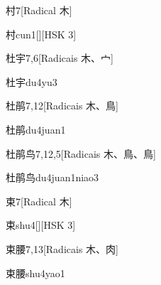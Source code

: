 \begin{entry}{村}{7}[Radical ⽊]
  \begin{phonetics}{村}{cun1}[][HSK 3]
  \end{phonetics}
\end{entry}

\begin{entry}{杜宇}{7,6}[Radicais ⽊、⼧]
  \begin{phonetics}{杜宇}{du4yu3}
  \end{phonetics}
\end{entry}

\begin{entry}{杜鹃}{7,12}[Radicais ⽊、⿃]
  \begin{phonetics}{杜鹃}{du4juan1}
  \end{phonetics}
\end{entry}

\begin{entry}{杜鹃鸟}{7,12,5}[Radicais ⽊、⿃、⿃]
  \begin{phonetics}{杜鹃鸟}{du4juan1niao3}
  \end{phonetics}
\end{entry}

\begin{entry}{束}{7}[Radical ⽊]
  \begin{phonetics}{束}{shu4}[][HSK 3]
  \end{phonetics}
\end{entry}

\begin{entry}{束腰}{7,13}[Radicais ⽊、⾁]
  \begin{phonetics}{束腰}{shu4yao1}
  \end{phonetics}
\end{entry}

